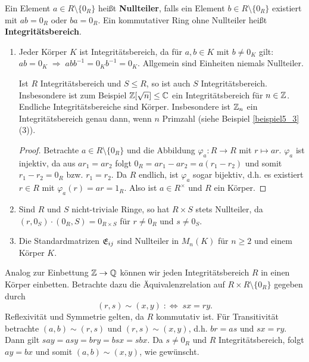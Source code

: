 \begin{definition}
	Ein Element $a \in R \setminus \{0_R\}$ heißt \textbf{Nullteiler}, falls ein Element $b \in R \setminus \{0_R\}$ existiert mit $ab = 0_R$ oder $ba = 0_R$. Ein kommutativer Ring ohne Nullteiler heißt \textbf{Integritätsbereich}.
\end{definition}
\begin{beispiel}\label{beispiel5_5}
	\begin{enumerate}[label=(\arabic*)]
		\item Jeder Körper $K$ ist Integritätsbereich, da für $a,b \in K$ mit $b \neq 0_K$ gilt: $ab = 0_K \;\Rightarrow\; abb^{-1} = 0_K b^{-1} = 0_K$. Allgemein sind Einheiten niemals Nullteiler.
		
		Ist $R$ Integritätsbereich und $S \leq R$, so ist auch $S$ Integritätsbereich. Insbesondere ist zum Beispiel $\mathbb{Z}[\sqrt{n}] \leq \mathbb{C}$ ein Integritätsbereich für $n \in \mathbb{Z}$. Endliche Integritätsbereiche sind Körper. Insbesondere ist $\mathbb{Z}_n$ ein Integritätsbereich genau dann, wenn $n$ Primzahl (siehe Beispiel \ref{beispiel5_3} (3)).
		\begin{proof}
			Betrachte $a \in R \setminus \{0_R\}$ und die Abbildung $\varphi_a \colon R \to R$ mit $r \mapsto ar$. $\varphi_a$ ist injektiv, da aus $ar_1 = ar_2$ folgt $0_R = ar_1 - ar_2 = a(r_1 - r_2)$ und somit $r_1 - r_2 = 0_R$ bzw. $r_1 = r_2$. Da $R$ endlich, ist $\varphi_a$ sogar bijektiv, d.h. es existiert $r \in R$ mit $\varphi_a(r) = ar = 1_R$. Also ist $a \in R^\times$ und $R$ ein Körper.
		\end{proof}
		\item Sind $R$ und $S$ nicht-triviale Ringe, so hat $R \times S$ stets Nullteiler, da $(r,0_S) \cdot (0_R, S) = 0_{R \times S}$ für $r \neq 0_R$ und $s \neq 0_S$.
		\item Die Standardmatrizen $\mathfrak{E}_{ij}$ sind Nullteiler in $M_n(K)$ für $n \geq 2$ und einem Körper $K$.
	\end{enumerate}
\end{beispiel}
Analog zur Einbettung $\mathbb{Z} \to \mathbb{Q}$ können wir jeden Integritätsbereich $R$ in einen Körper einbetten. Betrachte dazu die Äquivalenzrelation auf $R \times R \setminus\{0_R\}$ gegeben durch
\[(r,s) \sim (x,y) \;:\Leftrightarrow\; sx = ry.\]
Reflexivität und Symmetrie gelten, da $R$ kommutativ ist. Für Transitivität betrachte $(a,b) \sim (r,s)$ und $(r,s) \sim (x,y)$, d.h. $br=as$ und $sx = ry$. Dann gilt $say = asy = bry = bsx = sbx$. Da $s \neq 0_R$ und $R$ Integritätsbereich, folgt $ay = bx$ und somit $(a,b) \sim (x,y)$, wie gewünscht.

